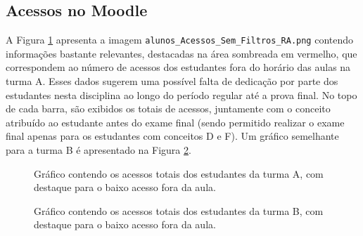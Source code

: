 



\subsection{Acessos no Moodle}

A Figura \ref{fig:ApeA_alunos_Acessos_Sem_Filtros_RA_turmaA} apresenta a imagem \verb|alunos_Acessos_Sem_Filtros_RA.png| contendo informa\-ções bastante relevantes, destacadas na área sombreada em vermelho, que correspondem ao número de acessos dos estudantes fora do horário das aulas na turma A. Esses dados sugerem uma possível falta de dedicação por parte dos estudantes nesta disciplina ao longo do período regular até a prova final. No topo de cada barra, são exibidos os totais de acessos, juntamente com o conceito atribuído ao estudante antes do exame final (sendo permitido realizar o exame final apenas para os estudantes com conceitos D e F). Um gráfico semelhante para a turma B é apresentado na Figura \ref{fig:ApeA_alunos_Acessos_Sem_Filtros_RA_turmaB}.

\begin{figure}[!ht]
    \centering
    \caption{Gráfico contendo os acessos totais dos estudantes da turma A, com destaque para o baixo acesso fora da aula.}
    \label{fig:ApeA_alunos_Acessos_Sem_Filtros_RA_turmaA}
\end{figure}

\begin{figure}[!ht]
    \centering
    \caption{Gráfico contendo os acessos totais dos estudantes da turma B, com destaque para o baixo acesso fora da aula.}
    \label{fig:ApeA_alunos_Acessos_Sem_Filtros_RA_turmaB}
\end{figure}

